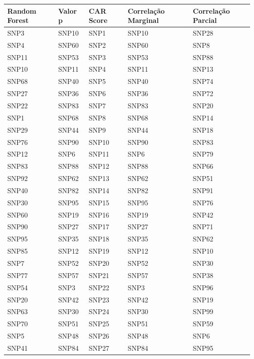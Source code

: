 \begin{table}[ht]
\centering
\begin{tabular}{lllll}
  \hline
Random Forest & Valor p & CAR Score & Correlação Marginal & Correlação Parcial \\ 
  \hline
SNP3 & SNP10 & SNP1 & SNP10 & SNP28 \\ 
  SNP4 & SNP60 & SNP2 & SNP60 & SNP8 \\ 
  SNP11 & SNP53 & SNP3 & SNP53 & SNP88 \\ 
  SNP10 & SNP11 & SNP4 & SNP11 & SNP13 \\ 
  SNP68 & SNP40 & SNP5 & SNP40 & SNP74 \\ 
  SNP27 & SNP36 & SNP6 & SNP36 & SNP72 \\ 
  SNP22 & SNP83 & SNP7 & SNP83 & SNP20 \\ 
  SNP1 & SNP68 & SNP8 & SNP68 & SNP14 \\ 
  SNP29 & SNP44 & SNP9 & SNP44 & SNP18 \\ 
  SNP76 & SNP90 & SNP10 & SNP90 & SNP83 \\ 
  SNP12 & SNP6 & SNP11 & SNP6 & SNP79 \\ 
  SNP83 & SNP88 & SNP12 & SNP88 & SNP66 \\ 
  SNP92 & SNP62 & SNP13 & SNP62 & SNP51 \\ 
  SNP40 & SNP82 & SNP14 & SNP82 & SNP91 \\ 
  SNP30 & SNP95 & SNP15 & SNP95 & SNP76 \\ 
  SNP60 & SNP19 & SNP16 & SNP19 & SNP42 \\ 
  SNP90 & SNP27 & SNP17 & SNP27 & SNP71 \\ 
  SNP95 & SNP35 & SNP18 & SNP35 & SNP62 \\ 
  SNP85 & SNP12 & SNP19 & SNP12 & SNP10 \\ 
  SNP7 & SNP52 & SNP20 & SNP52 & SNP30 \\ 
  SNP77 & SNP57 & SNP21 & SNP57 & SNP38 \\ 
  SNP54 & SNP3 & SNP22 & SNP3 & SNP96 \\ 
  SNP20 & SNP42 & SNP23 & SNP42 & SNP19 \\ 
  SNP63 & SNP30 & SNP24 & SNP30 & SNP99 \\ 
  SNP70 & SNP51 & SNP25 & SNP51 & SNP59 \\ 
  SNP5 & SNP48 & SNP26 & SNP48 & SNP6 \\ 
  SNP41 & SNP84 & SNP27 & SNP84 & SNP95 \\ 

\end{tabular}
\end{table}

